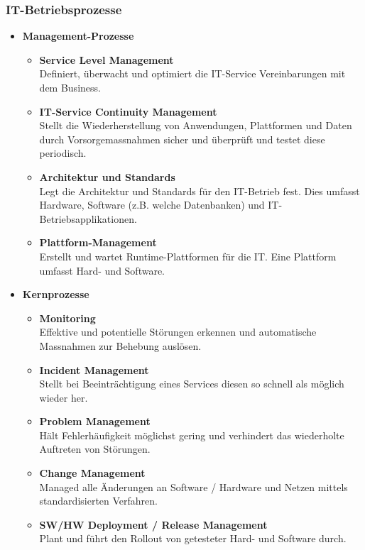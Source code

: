 \subsubsection{IT-Betriebsprozesse}
\begin{itemize}
	\item \textbf{Management-Prozesse}
	\begin{itemize}
		\item \textbf{Service Level Management}\\
			Definiert, überwacht und optimiert die IT-Service Vereinbarungen mit dem Business.
		\item \textbf{IT-Service Continuity Management} \\
			Stellt die Wiederherstellung von Anwendungen, Plattformen und Daten durch Vorsorgemassnahmen sicher und überprüft und testet diese periodisch.
		\item \textbf{Architektur und Standards} \\
			Legt die Architektur und Standards für den IT-Betrieb fest. Dies umfasst Hardware, Software (z.B. welche Datenbanken) und IT-Betriebsapplikationen.
		\item \textbf{Plattform-Management} \\
			Erstellt und wartet Runtime-Plattformen für die IT. Eine Plattform umfasst Hard- und Software.
	\end{itemize}
	\item \textbf{Kernprozesse}
	\begin{itemize}
		\item \textbf{Monitoring}\\
			Effektive und potentielle Störungen erkennen und automatische Massnahmen zur Behebung auslösen.
		\item \textbf{Incident Management} \\
			Stellt bei Beeinträchtigung eines Services diesen so schnell als möglich wieder her.
		\item \textbf{Problem Management} \\
			Hält Fehlerhäufigkeit möglichst gering und verhindert das wiederholte Auftreten von Störungen.
		\item \textbf{Change Management} \\
			Managed alle Änderungen an Software / Hardware und Netzen mittels standardisierten Verfahren.		
		\item \textbf{SW/HW Deployment / Release Management} \\
			Plant und führt den Rollout von getesteter Hard- und Software durch.		

\end{itemize}
\end{itemize}
